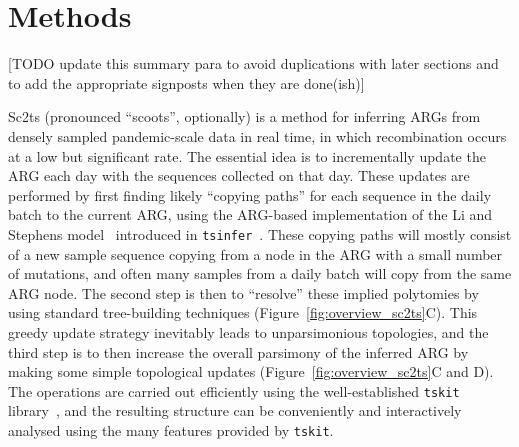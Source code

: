 \documentclass{article}
\begin{document}

\section{Methods}

[TODO update this summary para to avoid duplications with
later sections and to add the appropriate signposts
when they are done(ish)]

Sc2ts (pronounced ``scoots'', optionally) is a method for inferring
ARGs from densely sampled pandemic-scale data
in real time, in which recombination occurs at a low but significant rate.
The essential idea is to incrementally update the ARG each day
with the sequences collected on that day. These updates are performed by
first finding likely ``copying paths'' for each sequence in the daily
batch to the current ARG, using the ARG-based implementation of
the Li and Stephens model~\citep{Li2003-ib} introduced
in \texttt{tsinfer}~\citep{Kelleher2019-ba}.
These copying paths
will mostly consist of a new sample sequence copying from a node in the ARG
with a small number of mutations, and often many samples
from a daily batch will copy from the same ARG node. The second
step is then to ``resolve'' these implied polytomies by using
standard tree-building techniques (Figure~\ref{fig:overview_sc2ts}C).
This greedy update strategy inevitably leads to unparsimonious
topologies, and the third step is to then increase the
overall parsimony of the inferred ARG by making some simple topological
updates (Figure~\ref{fig:overview_sc2ts}C and D).
The operations are carried out efficiently using the well-established
\texttt{tskit}
library~\citep{Kelleher2018-xc,Ralph2020-efficiently,Tskit2023-tskit},
and the resulting structure can be conveniently and interactively
analysed using the many features provided by \texttt{tskit}.
\end{document}
